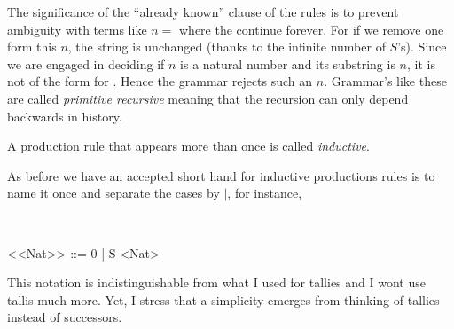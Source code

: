The significance of the ``already known'' clause of the rules is to prevent ambiguity 
with terms like $n=$ where the  continue forever.
For if we remove one  form this $n$, the string is unchanged (thanks to 
the infinite number of $S$'s).  Since we are engaged in deciding if $n$ is a natural number and its substring 
is $n$, it is not of the form  for .  Hence the grammar 
rejects such an $n$.  Grammar's like these are called \emph{primitive recursive}
meaning that the recursion can only depend backwards 
in history.

\begin{definition}
    A production rule that appears more than once is called \emph{inductive}.
\end{definition}

As before we have an accepted short hand for inductive productions rules is to name it once 
and separate the cases by $\mid$, for instance,
\begin{center}
 \\
\begin{Gcode}[]
<<Nat>> ::= 0 
        | S <Nat>
\end{Gcode}
\end{center}
This notation is indistinguishable from what I used for tallies and 
I wont use tallis much more.  Yet, I stress that a simplicity emerges from thinking 
of tallies instead of successors.
    


